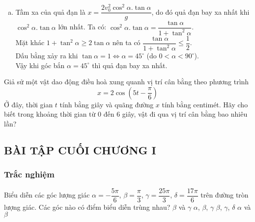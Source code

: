 \begin{bt}
{\begin{enumerate}[a)]
\begin{eqnarray*}
			      \end{eqnarray*} Do góc $0<\alpha<90^\circ$ nên ta chọn $\alpha\approx 30^\circ$ hoặc $\alpha\approx 60^\circ$.
			\item Tầm xa của quả đạn là $x=\dfrac{2 v_0^2 \cos ^2 \alpha.\tan \alpha}{g}$, do đó quả đạn bay xa nhất khi $ \cos ^2 \alpha.\tan \alpha$ lớn nhất. Ta có: $\cos ^2 \alpha.\tan \alpha =\dfrac{\tan \alpha}{1+\tan^2\alpha}$.\\ Mặt khác $1+\tan^2\alpha \ge 2\tan\alpha$ nên ta có $\dfrac{\tan \alpha}{1+\tan^2\alpha} \le \dfrac{1}{2}$.\\ Dấu bằng xảy ra khi $\tan\alpha =1 \Leftrightarrow \alpha=45^\circ $ (do $0<\alpha<90^\circ$). \\
			      Vậy khi góc bắn $\alpha=45^\circ$ thì quả đạn bay xa nhất.
		\end{enumerate}}
\end{bt}
\begin{bt}%
	Giả sử một vật dao động điều hoà xung quanh vị trí cân bằng theo phương trình
	$$
		x=2 \cos \left(5 t-\dfrac{\pi}{6}\right)
	$$
	Ở đây, thời gian $t$ tính bằng giây và quãng đường $x$ tính bằng centimét. Hãy cho biết trong khoảng thời gian từ $ 0 $ đến $ 6 $ giây, vật đi qua vị trí cân bằng bao nhiêu lần?
\end{bt}
\subsection{BÀI TẬP CUỐI CHƯƠNG I}
\subsubsection{Trắc nghiệm}
\begin{bt}%
	Biểu diễn các góc lượng giác $\alpha=-\dfrac{5\pi}{6}$, $\beta=\dfrac{\pi}{3}$, $\gamma=\dfrac{25\pi}{3}$, $\delta=\dfrac{17\pi}{6}$ trên đường tròn lượng giác. Các góc nào có điểm biểu diễn trùng nhau?
	\choice
	{\True $\beta$ và $\gamma$}
	{$\alpha$, $\beta$, $\gamma$}
	{$\beta$, $\gamma$, $\delta$}
	{$\alpha$ và $\beta$}
\end{bt}

